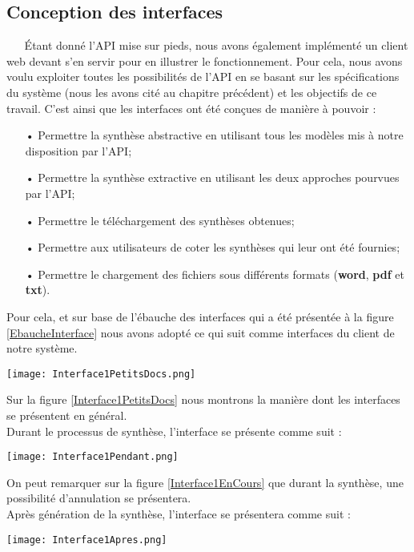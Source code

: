 \subsection{Conception des interfaces}\label{SectionConceptionInterfaces}
$ _{} $ $ _{} $ $ _{} $ $ _{} $ $ _{} $Étant donné l'API mise sur pieds, nous avons également implémenté un client web devant s'en servir pour en illustrer le fonctionnement. Pour cela, nous avons voulu exploiter toutes les possibilités de l'API en se basant sur les spécifications du système (nous les avons cité au chapitre précédent) et les objectifs de ce travail. C'est ainsi que les interfaces ont été conçues de manière à pouvoir :
\begin{itemize}
\item[•] Permettre la synthèse abstractive en utilisant tous les modèles mis à notre disposition par l'API;
\item[•] Permettre la synthèse extractive en utilisant les deux approches pourvues par l'API;
\item[•] Permettre le téléchargement des synthèses obtenues;
\item[•] Permettre aux utilisateurs de coter les synthèses qui leur ont été fournies;
\item[•] Permettre le chargement des fichiers sous différents formats (\textbf{word}, \textbf{pdf} et \textbf{txt}).
\end{itemize}
Pour cela, et sur base de l'ébauche des interfaces qui a été présentée à la figure \ref{EbaucheInterface} nous avons adopté ce qui suit comme interfaces du client de notre système.
\begin{center}
\texttt{[image: Interface1PetitsDocs.png]}
\label{Interface1PetitsDocs}
\end{center}
Sur la figure \ref{Interface1PetitsDocs} nous montrons la manière dont les interfaces se présentent en général.\\
Durant le processus de synthèse, l'interface se présente comme suit :
\begin{center}
\texttt{[image: Interface1Pendant.png]}
\label{Interface1EnCours}
\end{center}
On peut remarquer sur la figure \ref{Interface1EnCours} que durant la synthèse, une possibilité d'annulation se présentera.\\
Après génération de la synthèse, l'interface se présentera comme suit :
\begin{center}
\texttt{[image: Interface1Apres.png]}
\label{Interface1Apres}
\end{center}
